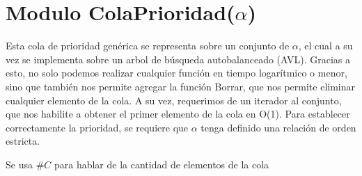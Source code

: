 \section{Modulo ColaPrioridad($\alpha$)}

Esta cola de prioridad genérica se representa sobre un conjunto de $\alpha$, el cual a su vez se implementa sobre un arbol de búsqueda autobalanceado (AVL). Gracias a esto, no solo podemos realizar cualquier función en tiempo logarítmico o menor, sino que también nos permite agregar la función Borrar, que nos permite eliminar cualquier elemento de la cola. A su vez, requerimos de un iterador al conjunto, que nos habilite a obtener el primer elemento de la cola en O(1). Para establecer correctamente la prioridad, se requiere que $\alpha$ tenga definido una relación de orden estricta.

Se usa $\#C$ para hablar de la cantidad de elementos de la cola

